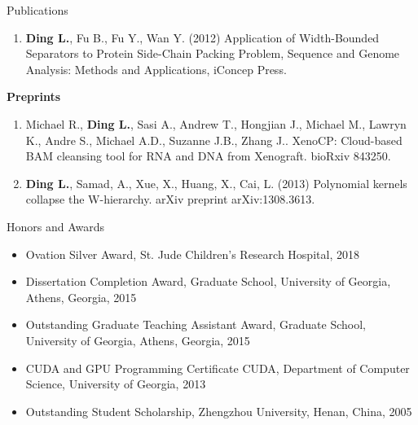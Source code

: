 \documentclass{resume} %
\begin{document}
\begin{rSection}{Publications}
\begin{enumerate}
\item \textbf{Ding L.}, Fu B., Fu Y., Wan Y. (2012) Application of Width-Bounded Separators to Protein Side-Chain Packing Problem, Sequence and Genome Analysis: Methods and Applications, iConcep Press.
\end{enumerate}


\textbf{Preprints}
\begin{enumerate}
\item Michael R., \textbf{Ding L.}, Sasi A., Andrew T., Hongjian J., Michael M., Lawryn K., Andre S., Michael A.D., Suzanne J.B., Zhang J.. XenoCP: Cloud-based BAM cleansing tool for RNA and DNA from Xenograft. bioRxiv 843250.

\item \textbf{Ding L.}, Samad, A., Xue, X., Huang, X., Cai, L. (2013) Polynomial kernels collapse the W-hierarchy. arXiv preprint arXiv:1308.3613.
\end{enumerate}
\end{rSection}


\begin{rSection}{Honors and Awards}
\begin{itemize}
\item Ovation Silver Award, St. Jude Children’s Research Hospital, 2018
\item Dissertation Completion Award, Graduate School, University of Georgia, Athens, Georgia, 2015
\item Outstanding Graduate Teaching Assistant Award,  Graduate School, University of Georgia, Athens, Georgia, 2015
\item CUDA and GPU Programming Certificate CUDA, Department of Computer Science, University of Georgia, 2013
\item Outstanding Student Scholarship, Zhengzhou University, Henan, China, 2005
\end{itemize}
\end{rSection}
\end{document}
